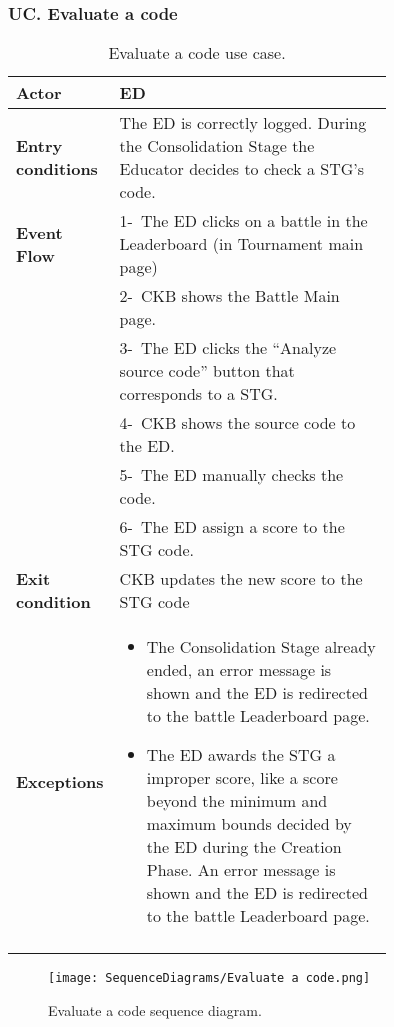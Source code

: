 \subsubsection*{UC\cuc . Evaluate a code}
\begin{center}
    \begin{longtable}{|l|p{0.75\linewidth}|}
        \hline
        \textbf{Actor}            & ED \\
        \hline
        \textbf{Entry conditions} & The ED is correctly logged. During the Consolidation Stage the Educator decides to check a STG’s code.        \\
        \hline
        \textbf{Event Flow}       & 1-\  The ED clicks on a battle in the Leaderboard (in Tournament main page)     \\
        & 2-\   CKB shows the Battle Main page.     \\
        & 3-\   The ED clicks the “Analyze source code” button that corresponds to a STG. \\
        & 4-\   CKB shows the source code to the ED.     \\
        & 5-\   The ED manually checks the code.     \\
        & 6-\   The ED assign a score to the STG code.     \\
        \hline
        \textbf{Exit condition}   & CKB updates the new score to the STG code       \\
        \hline
        \textbf{Exceptions}        & \begin{itemize}
            \item The Consolidation Stage already ended, an error message is shown and the ED is redirected to the battle Leaderboard page.
            \item The ED awards the STG a improper score, like a score beyond the minimum and maximum bounds decided by the ED during the Creation Phase. An error message is shown and the ED is redirected to the battle Leaderboard page.
         \end{itemize}    \\
        \hline
        \caption{Evaluate a code use case.}
        \label{tab: evaluate_a_code_use_case}
    \end{longtable}
\end{center}


\begin{figure}[H]
    \begin{center}
        \texttt{[image: SequenceDiagrams/Evaluate a code.png]}
        \caption{Evaluate a code sequence diagram.}
        \label{fig:evaluate_a_code_seqd}%
    \end{center}
\end{figure}

